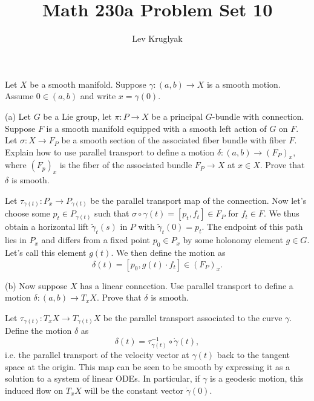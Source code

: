 \documentclass{../../templates/lkx_pset}
\title{Math 230a Problem Set 10}
\author{Lev Kruglyak}
\begin{document}
\maketitle

\begin{problem}
  Let $X$ be a smooth manifold. Suppose $\gamma : (a,b) \to X$ is a smooth motion. Assume $0\in (a,b)$ and write $x=\gamma(0)$.
\end{problem}

\begin{parts}
  \begin{part}{(a)}
    Let $G$ be a Lie group, let $\pi : P \to X$ be a principal $G$-bundle with connection. Suppose $F$ is a smooth manifold equipped with a smooth left action of $G$ on $F$. Let $\sigma : X \to F_P$ be a smooth section of the associated fiber bundle with fiber $F$. Explain how to use parallel transport to define a motion $\delta : (a,b) \to (F_P)_x$, where $(F_p)_x$ is the fiber of the associated bundle $F_P \to X$ at $x\in X$. Prove that $\delta$ is smooth.
  \end{part}

  Let $\tau_{\gamma(t)} : P_x \to P_{\gamma(t)}$ be the parallel transport map of the connection. Now let's choose some $p_t\in P_{\gamma(t)}$ such that $\sigma\circ \gamma(t) = [p_t,f_t]\in F_P$ for $f_t\in F$. We thus obtain a horizontal lift $\widetilde{\gamma}_t(s)$ in $P$ with $\widetilde{\gamma}_t(0)=p_t$. The endpoint of this path lies in $P_x$ and differs from a fixed point $p_0\in P_x$ by some holonomy element $g\in G$. Let's call this element $g(t)$.
  We then define the motion as 
  \[
    \delta(t) = [p_0, g(t)\cdot f_t]\in (F_P)_x.
  \]


  \begin{part}{(b)}
    Now suppose $X$ has a linear connection. Use parallel transport to define a motion $\delta : (a,b) \to T_x X$. Prove that $\delta$ is smooth.
  \end{part}

  Let $\tau_{\gamma(t)} : T_x X \to T_{\gamma(t)} X$ be the parallel transport associated to the curve $\gamma$. Define the motion $\delta$ as
  \[
    \delta(t) = \tau^{-1}_{\gamma(t)}\circ\dot{\gamma}(t),
  \]
  i.e. the parallel transport of the velocity vector at $\gamma(t)$ back to the tangent space at the origin. This map can be seen to be smooth by expressing it as a solution to a system of linear ODEs. In particular, if $\gamma$ is a geodesic motion, this induced flow on $T_x X$ will be the constant vector $\dot{\gamma}(0)$. 
\end{parts}
\end{document}

